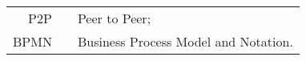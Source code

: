 \begin{center}
	\begin{tabular}[t]{rp{5mm}p{12cm}}
		P2P & & Peer to Peer; \\
		BPMN & & Business Process Model and Notation.
	\end{tabular}
\end{center}
